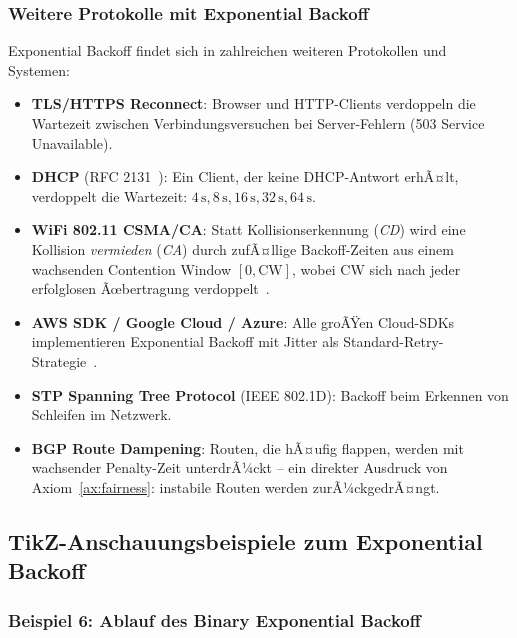 ﻿\documentclass[a4paper,12pt]{article}
\theoremstyle{definition}
\begin{document}
\subsubsection{Weitere Protokolle mit Exponential Backoff}

Exponential Backoff findet sich in zahlreichen weiteren Protokollen
und Systemen:

\begin{itemize}
  \item \textbf{TLS/HTTPS Reconnect}: Browser und HTTP-Clients verdoppeln
        die Wartezeit zwischen Verbindungsversuchen bei Server-Fehlern
        (503 Service Unavailable).
  \item \textbf{DHCP} (RFC 2131~\cite{rfc2131}): Ein Client, der keine
        DHCP-Antwort erhÃ¤lt, verdoppelt die Wartezeit:
        $4\,\mathrm{s}, 8\,\mathrm{s}, 16\,\mathrm{s}, 32\,\mathrm{s},
        64\,\mathrm{s}$.
  \item \textbf{WiFi 802.11 CSMA/CA}: Statt Kollisionserkennung
        (\emph{CD}) wird eine Kollision \emph{vermieden} (\emph{CA})
        durch zufÃ¤llige Backoff-Zeiten aus einem wachsenden Contention
        Window $[0, \mathrm{CW}]$, wobei $\mathrm{CW}$ sich nach
        jeder erfolglosen Ãœbertragung verdoppelt~\cite{ieee80211}.
  \item \textbf{AWS SDK / Google Cloud / Azure}: Alle groÃŸen Cloud-SDKs
        implementieren Exponential Backoff mit Jitter als Standard-Retry-
        Strategie~\cite{amazon2022backoff}.
  \item \textbf{STP Spanning Tree Protocol} (IEEE 802.1D): Backoff beim
        Erkennen von Schleifen im Netzwerk.
  \item \textbf{BGP Route Dampening}: Routen, die hÃ¤ufig
        flappen, werden mit wachsender Penalty-Zeit unterdrÃ¼ckt -- ein
        direkter Ausdruck von Axiom~\ref{ax:fairness}: instabile Routen
        werden zurÃ¼ckgedrÃ¤ngt.
\end{itemize}

\subsection{TikZ-Anschauungsbeispiele zum Exponential Backoff}

\subsubsection{Beispiel 6: Ablauf des Binary Exponential Backoff}
\end{document}
